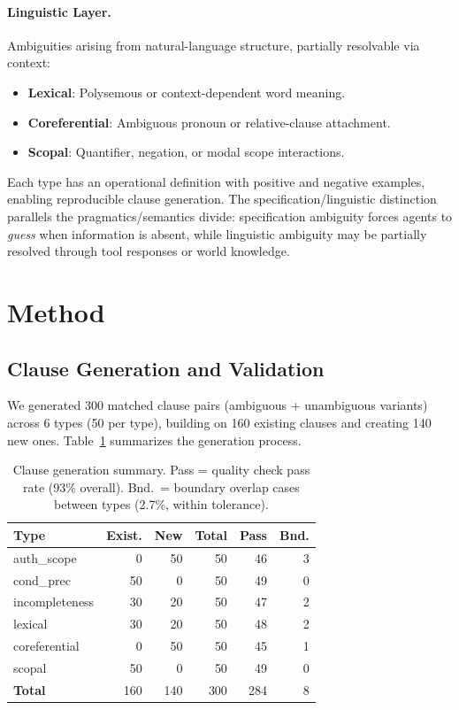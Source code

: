 \documentclass[11pt]{article}
\begin{document}
\paragraph{Linguistic Layer.}
Ambiguities arising from natural-language structure, partially resolvable via context:
\begin{itemize}[nosep,leftmargin=*]
\item \textbf{Lexical}: Polysemous or context-dependent word meaning.
\item \textbf{Coreferential}: Ambiguous pronoun or relative-clause attachment.
\item \textbf{Scopal}: Quantifier, negation, or modal scope interactions.
\end{itemize}

Each type has an operational definition with positive and negative examples, enabling reproducible clause generation.
The specification/linguistic distinction parallels the pragmatics/semantics divide: specification ambiguity forces agents to \emph{guess} when information is absent, while linguistic ambiguity may be partially resolved through tool responses or world knowledge.

\section{Method}
\label{sec:method}

\subsection{Clause Generation and Validation}
\label{sec:clause_gen}

We generated 300 matched clause pairs (ambiguous + unambiguous variants) across 6 types (50 per type), building on 160 existing clauses and creating 140 new ones.
Table~\ref{tab:clause_gen} summarizes the generation process.

\begin{table}[t]
\centering
\small
\begin{tabular}{lrrrrr}
\toprule
\textbf{Type} & \textbf{Exist.} & \textbf{New} & \textbf{Total} & \textbf{Pass} & \textbf{Bnd.} \\
\midrule
auth\_scope & 0 & 50 & 50 & 46 & 3 \\
cond\_prec & 50 & 0 & 50 & 49 & 0 \\
incompleteness & 30 & 20 & 50 & 47 & 2 \\
lexical & 30 & 20 & 50 & 48 & 2 \\
coreferential & 0 & 50 & 50 & 45 & 1 \\
scopal & 50 & 0 & 50 & 49 & 0 \\
\midrule
\textbf{Total} & 160 & 140 & 300 & 284 & 8 \\
\bottomrule
\end{tabular}
\caption{Clause generation summary. Pass = quality check pass rate (93\% overall). Bnd.\ = boundary overlap cases between types (2.7\%, within tolerance).}
\label{tab:clause_gen}
\end{table}
\end{document}
